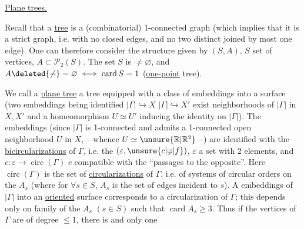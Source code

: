\uline{Plane trees.}\hfill{}

Recall that a \uline{tree} is a (combinatorial)
1-connected graph (which implies that it is a
strict graph, i.e. with no closed edges, and no two distinct 
joined by  most one edge). One can therefore
consider the structure given by $(S,A)$,
$S$ set of vertices, $A\subset\mathcal P_2(S)$.  The set $S$ is $\ne\varnothing$,
and $A\deleted{\ne}=\varnothing\iff\operatorname{card}S=1$ (\uline{one-point} tree).

We call a \uline{plane tree} a tree equipped with a
class of embeddings into a surface
(two embeddings being identified $|\Gamma|\hookrightarrow X$
$|\Gamma|\hookrightarrow X'$  exist neighborhoods of $|\Gamma|$ in $X,X'$
and a homeomorphism $U\simeq U'$ inducing the identity on $|\Gamma|$).
The  embeddings (since $|\Gamma|$ is 1-connected and
admits a 1-connected open neighborhood $U$ in $X$,
-- whence $U\simeq\unsure{\mathbb R|\mathbb R^2}$ --) are identified with the \uline{bicircularizations}
of $\Gamma$, i.e. the   $(\varepsilon,\unsure{c|\varphi|f})$, $\varepsilon$ a
set with 2 elements,  and $c:\varepsilon\longrightarrow\operatorname{circ}(\Gamma)$
$c$ compatible with the ``passages to the opposite''. Here $\operatorname{circ}(\Gamma)$
is the set of \uline{circularizations} of $\Gamma$, i.e.
of systems of circular orders on the
$A_s$ (where for $\forall s\in S$, $A_s$ is the set of edges incident
to $s$). A  embeddings of $|\Gamma|$ into an
\uline{oriented} surface corresponds to a circularization of
$\Gamma$; this depends only on  family of the
$A_s$ $(s\in S)$ such that $\operatorname{card}A_s\geq3$. Thus if the vertices
of $\Gamma$ are of degree $\leq1$, there is  and only one
